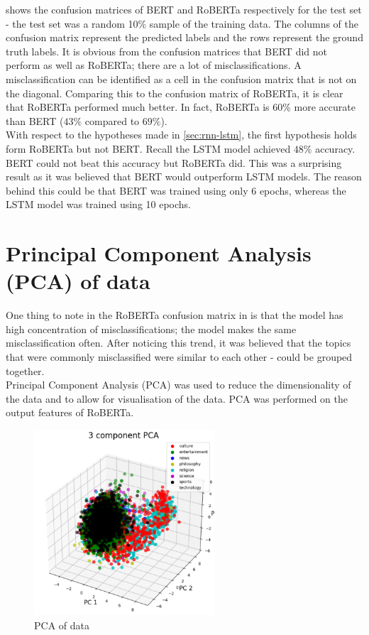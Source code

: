  shows the confusion matrices of BERT and RoBERTa respectively for the test set - the test set was a
random 10\% sample of the training data. The columns of the confusion matrix represent the predicted labels and the rows represent the
ground truth labels. It is obvious from the confusion matrices that BERT did not perform as well as RoBERTa; there are a lot of
misclassifications. A misclassification can be identified as a cell in the confusion matrix that is not on the diagonal. Comparing this
to the confusion matrix of RoBERTa, it is clear that RoBERTa performed much better. In fact, RoBERTa is $60\%$ more accurate than BERT
($43\%$ compared to $69\%$).\\
With respect to the hypotheses made in \cref{sec:rnn-lstm}, the first hypothesis holds form RoBERTa but not BERT. Recall the LSTM
model achieved $48\%$ accuracy. BERT could not beat this accuracy but RoBERTa did. This was a surprising result as it was believed
that BERT would outperform LSTM models. The reason behind this could be that BERT was trained using only 6 epochs, whereas the LSTM model
was trained using 10 epochs.
\section{Principal Component Analysis (PCA) of data}
One thing to note in the RoBERTa confusion matrix in  is that the model has high concentration
of misclassifications; the model makes the same misclassification often. After noticing this trend, it was believed that the topics
that were commonly misclassified were similar to each other - could be grouped together.\\
Principal Component Analysis (PCA) was used to reduce the dimensionality of the data and to allow for visualisation of the data. PCA
was performed on the output features of RoBERTa.
\newpage
\begin{figure}[hbtp]
    \centering
    \includegraphics[width=0.6\textwidth]{../images/pca.png}
    \caption{PCA of data}
    \label{fig:pca}
\end{figure}

